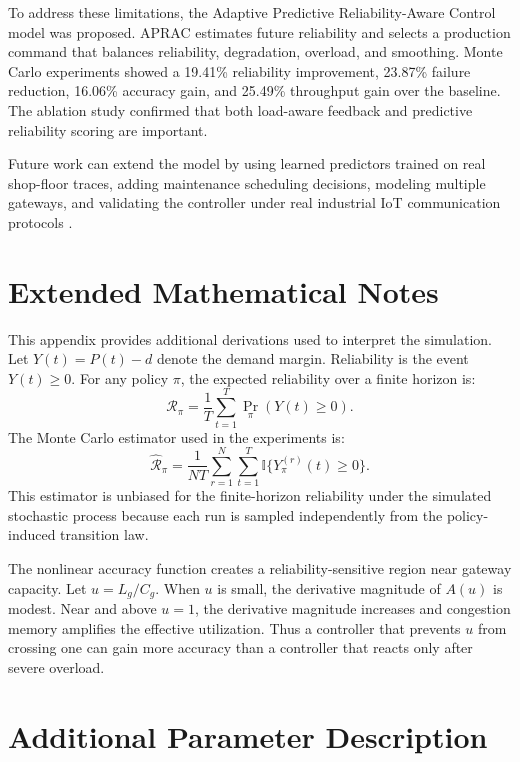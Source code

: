 \documentclass[journal]{IEEEtran}
\begin{document}
To address these limitations, the Adaptive Predictive Reliability-Aware Control model was proposed. APRAC estimates future reliability and selects a production command that balances reliability, degradation, overload, and smoothing. Monte Carlo experiments showed a 19.41\% reliability improvement, 23.87\% failure reduction, 16.06\% accuracy gain, and 25.49\% throughput gain over the baseline. The ablation study confirmed that both load-aware feedback and predictive reliability scoring are important.

Future work can extend the model by using learned predictors trained on real shop-floor traces, adding maintenance scheduling decisions, modeling multiple gateways, and validating the controller under real industrial IoT communication protocols \cite{koren2018reconfigurable}.

\appendix

\section{Extended Mathematical Notes}

This appendix provides additional derivations used to interpret the simulation. Let $Y(t)=P(t)-d$ denote the demand margin. Reliability is the event $Y(t)\ge0$. For any policy $\pi$, the expected reliability over a finite horizon is:
\begin{equation}
\mathcal{R}_{\pi}=\frac{1}{T}\sum_{t=1}^{T}\Pr_{\pi}(Y(t)\ge0).
\end{equation}
The Monte Carlo estimator used in the experiments is:
\begin{equation}
\widehat{\mathcal{R}}_{\pi}
=\frac{1}{NT}\sum_{r=1}^{N}\sum_{t=1}^{T}
\mathbb{I}\{Y_{\pi}^{(r)}(t)\ge0\}.
\end{equation}
This estimator is unbiased for the finite-horizon reliability under the simulated stochastic process because each run is sampled independently from the policy-induced transition law.

The nonlinear accuracy function creates a reliability-sensitive region near gateway capacity. Let $u=L_g/C_g$. When $u$ is small, the derivative magnitude of $A(u)$ is modest. Near and above $u=1$, the derivative magnitude increases and congestion memory amplifies the effective utilization. Thus a controller that prevents $u$ from crossing one can gain more accuracy than a controller that reacts only after severe overload.

\section{Additional Parameter Description}
\end{document}
